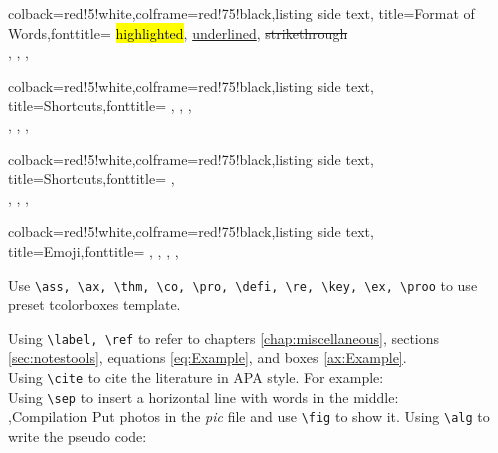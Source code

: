 \documentclass[10pt]{report}
\begin{document}
\begin{tcblisting}{colback=red!5!white,colframe=red!75!black,listing side text,
        title=Format of Words,fonttitle=\bfseries}
    \hl{highlighted}, \ul{underlined}, \st{strikethrough}\\
    , , , 
\end{tcblisting}
\begin{tcblisting}{colback=red!5!white,colframe=red!75!black,listing side text,
        title=Shortcuts,fonttitle=\bfseries}
    \RR, \NN, \ZZ, \QQ\\
    \bA, \bB, \bC, \bD
\end{tcblisting}
\begin{tcblisting}{colback=red!5!white,colframe=red!75!black,listing side text,
        title=Shortcuts,fonttitle=\bfseries}
    , \\
    \cA, \cB, \cC, \cD
\end{tcblisting}
\begin{tcblisting}{colback=red!5!white,colframe=red!75!black,listing side text,
        title=Emoji,fonttitle=\bfseries}
    \emogood, \emobad, \emocool, \emoheart, \emotree
\end{tcblisting}

\no Use \verb=\ass, \ax, \thm, \co, \pro, \defi, \re, \key, \ex, \proo= to
\no use preset tcolorboxes template.
 \label{ax:Example}
 \label{pro:Example}

\no Using \verb=\label, \ref= to refer to chapters \ref{chap:miscellaneous},
sections \ref{sec:notestools}, equations \ref{eq:Example}, and boxes \ref{ax:Example}.\\
\no Using \verb=\cite= to cite the literature in APA style. For example:
\cite{Angrist}\\
\no Using \verb=\sep= to insert a horizontal line with words in the middle:\\
\sep{Compilation}
Put photos in the \textit{pic} file and use \verb|\fig| to show it.
Using \verb=\alg= to write the pseudo code:
\end{document}
